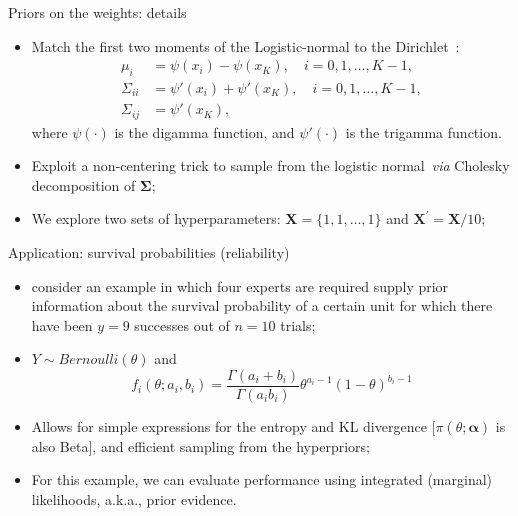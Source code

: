 \begin{frame}{Priors on the weights: details}
 \begin{itemize}
\item Match the first two moments of the Logistic-normal to the Dirichlet~\citep{aitchson1980}:
  \begin{align*}
 \label{eq:momentmatching}
 \mu_i & = \psi(x_i) - \psi(x_K), \quad i=0,1,\ldots,K-1, \\
 \Sigma_{ii} & = \psi'(x_i) + \psi'(x_K), \quad i=0,1,\ldots,K-1, \\
 \Sigma_{ij} & = \psi'(x_K),
\end{align*}
where $\psi(\cdot)$ is the digamma function, and $\psi'(\cdot)$ is the trigamma function.
\item Exploit a non-centering trick to sample from the logistic normal~\textit{via} Cholesky decomposition of $\boldsymbol \Sigma$;  
\item We explore two sets of hyperparameters: $\boldsymbol X = \{1, 1, \ldots, 1\}$ and $\boldsymbol X^\prime = \boldsymbol X/10$;
 \end{itemize}
\end{frame}
\begin{frame}{Application: survival probabilities (reliability)}
 \begin{itemize}
  \item \cite{savchuk1994} consider an example in which four experts are required supply prior information about the survival probability of
a certain unit for which there have been $y = 9$ successes out of $n = 10$ trials;
  \item $Y\sim Bernoulli(\theta)$ and
  \[f_i(\theta;a_i, b_i) = \frac{\Gamma(a_i + b_i)}{\Gamma(a_i b_i)} \theta^{a_i-1}(1-\theta)^{b_i-1}\]
  \item Allows for simple expressions for the entropy and KL divergence [$\pi(\theta; \boldsymbol\alpha)$ is also Beta], and efficient sampling from the hyperpriors; 
  \item For this example, we can evaluate performance using integrated (marginal) likelihoods, a.k.a., prior evidence.
 \end{itemize}
\end{frame}
